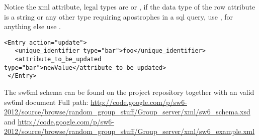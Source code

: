 Notice the  xml attribute, legal types are  or , if the data type of the row attribute is a string or any other type requiring apostrophes
in a sql query, use , for anything else use .

\begin{lstlisting}[label=code:sw6mlExample02,caption="sw6ml Update syntax example]
 <Entry action="update">
   <unique_identifier type="bar">foo</unique_identifier>
   <attribute_to_be_updated type="bar">newValue</attribute_to_be_updated>
 </Entry>
\end{lstlisting}

The sw6ml schema can be found on the project repository together with an valid sw6ml document
Full path: \url{http://code.google.com/p/sw6-2012/source/browse/random_group_stuff/Group_server/xml/sw6_schema.xsd}
and \url{http://code.google.com/p/sw6-2012/source/browse/random_group_stuff/Group_server/xml/sw6_example.xml} %





